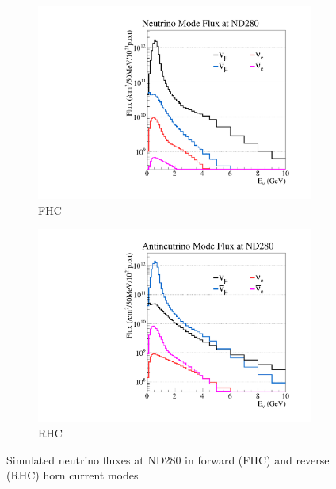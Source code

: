 \begin{figure}[h]
	\begin{subfigure}[t]{0.45\textwidth}
		\includegraphics[width=\textwidth, trim={0mm 0mm 0mm 0mm}, clip,page=1]{figures/det_chap/beam/nd5_alltunedflux_run1-8_zoomed_13a}
		\caption{FHC}
	\end{subfigure}
	\begin{subfigure}[t]{0.45\textwidth}
		\includegraphics[width=\textwidth, trim={0mm 0mm 0mm 0mm}, clip,page=1]{figures/det_chap/beam/nd5_alltunedflux_run5c-7b_zoomed_antinu_13a}
		\caption{RHC}
	\end{subfigure}
	\caption{Simulated neutrino fluxes at ND280 in forward (FHC) and reverse (RHC) horn current modes}
	\label{fig:flux_1to8}
\end{figure}

